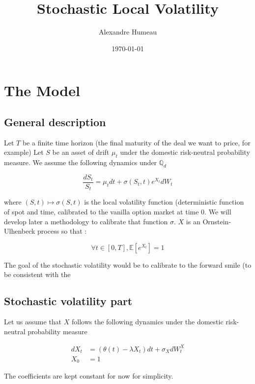 \documentclass{article}
\begin{document}
\title{Stochastic Local Volatility}
\author{Alexandre Humeau}
\date{\today}
\maketitle

\section{The Model}
\subsection{General description}
Let $T$ be a finite time horizon (the final maturity of the deal we want to price, for example)
Let $S$ be an asset of drift $\mu_t$ under the domestic risk-neutral probability measure. We assume the following dynamics under $\mathbb{Q}_d$

\begin{equation}
	\frac{dS_t}{S_t} = \mu_t dt + \sigma(S_t,t) e^{X_t} dW_t
\end{equation}

\noindent where $(S,t) \mapsto \sigma(S,t)$ is the local volatility function (deterministic function of spot and time, calibrated to the vanilla option market at time $0$. We will develop later a methodology to calibrate that function $\sigma$. $X$ is an Ornstein-Ulhenbeck process so that : 

\begin{equation}
	\forall t \in [0,T], \mathbb{E}\left[e^{X_t}\right] = 1
\end{equation}

\noindent The goal of the stochastic volatility would be to calibrate to the forward smile (to be consistent with the 

\subsection{Stochastic volatility part}
Let us assume that $X$ follows the following dynamics under the domestic risk-neutral probability measure

\begin{equation}
\begin{aligned}
	dX_t &= (\theta(t) - \lambda X_t) dt + \sigma_X dW_t^X\\
	X_0 &= 1
\end{aligned}
\end{equation}

\noindent The coefficients are kept constant for now for simplicity.
\end{document}
